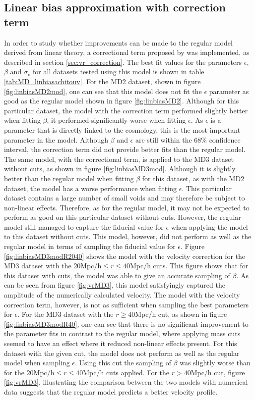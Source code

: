 \subsection{Linear bias approximation with correction term}
In order to study whether improvements can be made to the regular model derived from linear theory, a correctional term proposed by \cite{Achitouv_streaming} was implemented, as described in section \ref{sec:vr_correction}. The best fit values for the parameters $\epsilon$, $\beta$ and $\sigma_v$ for all datasets tested using this model is shown in table \ref{tab:MD_linbiasachitouv}. For the MD2 dataset, shown in figure \ref{fig:linbiasMD2mod}, one can see that this model does not fit the $\epsilon$ parameter as good as the regular model shown in figure \ref{fig:linbiasMD2}. Although for this particular dataset, the model with the correction term performed slightly better when fitting $\beta$, it performed significantly worse when fitting $\epsilon$. As $\epsilon$ is a parameter that is directly linked to the cosmology, this is the most important parameter in the model. Although $\beta$ and $\epsilon$ are still within the $68\%$ confidence interval, the correction term did not provide better fits than the regular model.\\\indent
The same model, with the correctional term, is applied to the MD3 dataset without cuts, as shown in figure \ref{fig:linbiasMD3mod}. Although it is slightly better than the regular model when fitting $\beta$ for this dataset, as with the MD2 dataset, the model has a worse performance when fitting $\epsilon$. This particular dataset contains a large number of small voids and may therefore be subject to non-linear effects. Therefore, as for the regular model, it may not be expected to perform as good on this particular dataset without cuts. However, the regular model still managed to 
capture the fiducial value for $\epsilon$ when applying the model to this dataset without cuts. This model, however, did not perform as well as the regular model in terms of sampling the fiducial value for $\epsilon$.
Figure \ref{fig:linbiasMD3modR2040} shows the model with the velocity correction for the MD3 dataset with the $20$Mpc/h$\leq r\leq 40$Mpc/h cuts. This figure shows that for this dataset with cuts, the model was able to give an accurate sampling of $\beta$. As can be seen from figure \ref{fig:vrMD3}, this model satisfyingly captured the amplitude of the numerically calculated velocity. The model with the velocity correction term, however, is not as sufficient when sampling the best parameters for $\epsilon$. For the MD3 dataset with the $r \geq 40$Mpc/h cut, as shown in figure \ref{fig:linbiasMD3modR40}, one can see that there is no significant improvement to the parameter fits in contrast to the regular model, where applying mass cuts seemed to have an effect where it reduced non-linear effects present. For this dataset with the given cut, the model does not perform as well as the regular model when sampling $\epsilon$. Using this cut the sampling of $\beta$ was slightly worse than for the $20$Mpc/h$\leq r\leq 40$Mpc/h cuts applied. For the $r>40$Mpc/h cut, figure \ref{fig:vrMD3}, illustrating the comparison between the two models with numerical data suggests that the regular model predicts a better velocity profile.\\\indent

